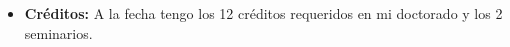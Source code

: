 \begin{itemize}
\begin{itemize}

\end{itemize}

\item  \textbf{Cr\'editos:} 
A la fecha tengo los 12 cr\'editos requeridos en mi doctorado y los 2 seminarios.


\end{itemize}




